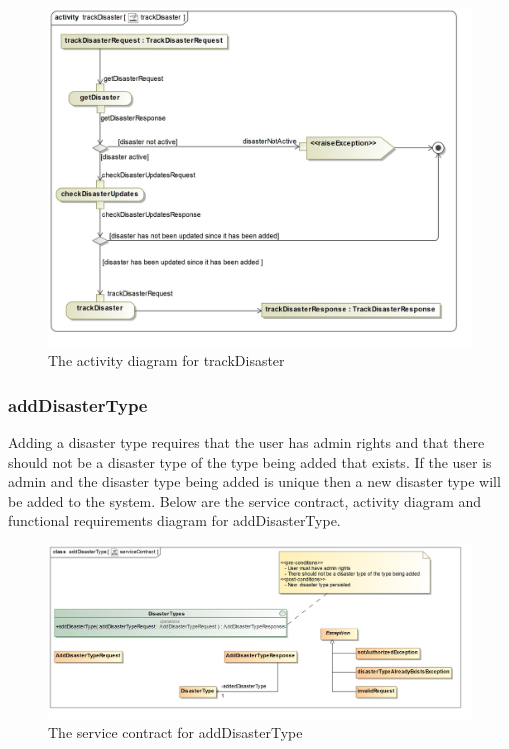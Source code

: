 \begin{figure}[H]
	\centering
	\includegraphics[width=1.2\textwidth]{../images/funcReq/trackDisasterActivityDiagram.jpg}
	\caption{The activity diagram for trackDisaster \label{overflow}}
\end{figure}

\subsubsection{addDisasterType}

Adding a disaster type requires that the user has admin rights and that there should not be a disaster type of the type being added that exists. If the user is admin and the disaster type being added is unique then a new disaster type will be added to the system. Below are the service contract, activity diagram and functional requirements diagram for addDisasterType.

\begin{figure}[H]
	\centering
	\includegraphics[scale=0.18]{../images/funcReq/addDisasterTypeServiceContract.jpg}
	\caption{The service contract for addDisasterType \label{overflow}}
\end{figure}


